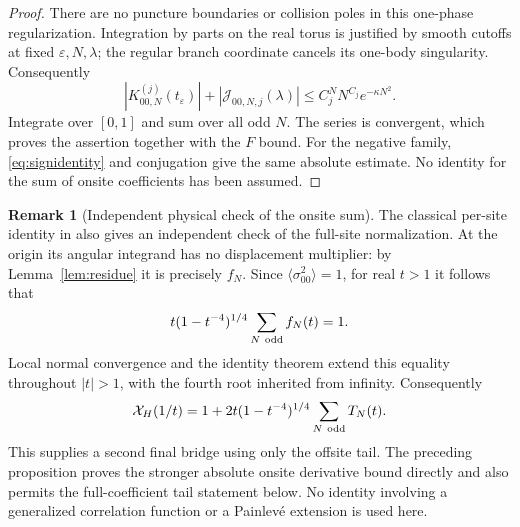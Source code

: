 \documentclass[11pt]{article}
\numberwithin{equation}{section}
\theoremstyle{definition}
\newtheorem{remark}[theorem]{Remark}
\newcommand{\eps}{\varepsilon}
\begin{document}
\begin{proof}
There are no puncture boundaries or collision poles in this
one-phase regularization. Integration by parts on the real torus
is justified by smooth cutoffs at fixed $\eps,N,\lambda$; the
regular branch coordinate cancels its one-body singularity.
Consequently
\[
 |K_{00,N}^{(j)}(t_\eps)|+
 |\mathcal J_{00,N,j}(\lambda)|
 \le C_j^N N^{C_j}e^{-\kappa N^2}.
\]
Integrate over $[0,1]$ and sum over all odd $N$. The series is
convergent, which proves the assertion together with the $F$ bound.
For the negative family, \eqref{eq:signidentity} and conjugation
give the same absolute estimate. No identity for the sum of onsite
coefficients has been assumed.
\end{proof}

\begin{remark}[Independent physical check of the onsite sum]
The classical per-site identity in \cite[eqs.~(4.1)--(4.2)]{Orrick2001}
also gives an independent check of the full-site normalization.
At the origin its angular integrand has no displacement multiplier:
by Lemma~\ref{lem:residue} it is precisely $f_N$.
Since $\langle\sigma_{00}^2\rangle=1$, for real $t>1$ it follows that
\[
 t(1-t^{-4})^{1/4}\sum_{N\ {\rm odd}}f_N(t)=1.
\]
Local normal convergence and the identity theorem extend this equality
throughout $|t|>1$, with the fourth root inherited from infinity.
Consequently
\[
 \mathcal X_H(1/t)=1+2t(1-t^{-4})^{1/4}
                    \sum_{N\ {\rm odd}}T_N(t).
\]
This supplies a second final bridge using only the offsite tail.
The preceding proposition proves the stronger absolute onsite
derivative bound directly and also permits the full-coefficient
tail statement below. No identity involving a generalized
correlation function or a Painlev\'e extension is used here.
\end{remark}
\end{document}
